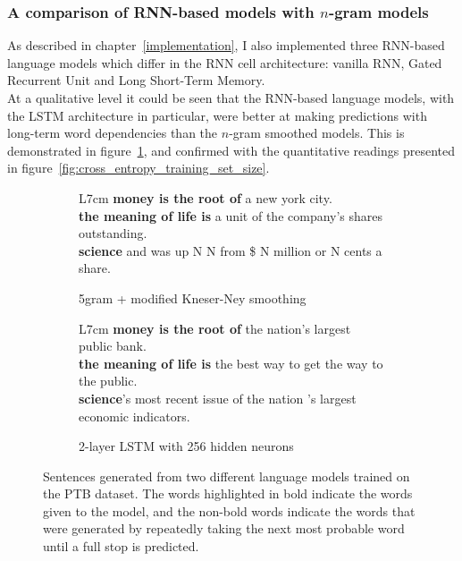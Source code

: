 \documentclass[a4paper, 12pt]{report}
\newcommand{\tbf}[1]{\textbf{#1}}
\begin{document}
\subsubsection*{A comparison of RNN-based models with $n$-gram models}

As described in chapter~\ref{implementation}, I also implemented three RNN-based language models which differ in the RNN cell architecture: vanilla RNN, Gated Recurrent Unit and Long Short-Term Memory. \\

At a qualitative level it could be seen that the RNN-based language models, with the LSTM architecture in particular, were better at making predictions with long-term word dependencies than the $n$-gram smoothed models. This is demonstrated in figure~\ref{fig:generated_sentences}, and confirmed with the quantitative readings presented in figure~\ref{fig:cross_entropy_training_set_size}. \\

\begin{figure}[h]
\captionsetup{justification=centering}
\centering
\begin{subfigure}{0.5\linewidth}
	\centering
	\begin{tabular}{L{7cm}}
		\hline
		\tbf{money is the root of} a new york city. \\ \hline
		\tbf{the meaning of life is} a unit of the company's shares outstanding. \\ \hline
		\tbf{science} and was up N N from \$ N million or N cents a share. \\ \hline
	\end{tabular}
	\caption{5gram + modified Kneser-Ney smoothing}
\end{subfigure}%
\begin{subfigure}{0.5\linewidth}
	\centering
	\begin{tabular}{L{7cm}}
		\hline
		\tbf{money is the root of} the nation's largest public bank. \\ \hline
		\tbf{the meaning of life is} the best way to get the way to the public. \\ \hline
		\tbf{science}'s most recent issue of the nation 's largest economic indicators. \\ \hline
	\end{tabular}
	\caption{2-layer LSTM with 256 hidden neurons}
\end{subfigure}
\caption{Sentences generated from two different language models trained on the PTB dataset. The words highlighted in bold indicate the words given to the model, and the non-bold words indicate the words that were generated by repeatedly taking the next most probable word until a full stop is predicted.}
\label{fig:generated_sentences}
\end{figure}
\end{document}
